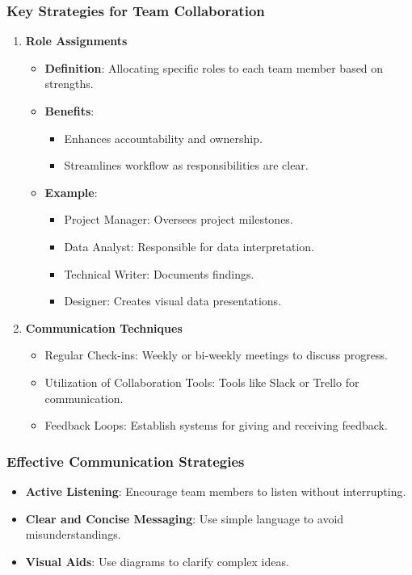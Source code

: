 \documentclass[aspectratio=169]{beamer}
\begin{document}
\begin{frame}[fragile]
    \frametitle{Key Strategies for Team Collaboration}
    \begin{enumerate}
        \item \textbf{Role Assignments}
        \begin{itemize}
            \item \textbf{Definition}: Allocating specific roles to each team member based on strengths.
            \item \textbf{Benefits}:
            \begin{itemize}
                \item Enhances accountability and ownership.
                \item Streamlines workflow as responsibilities are clear.
            \end{itemize}
            \item \textbf{Example}:
            \begin{itemize}
                \item Project Manager: Oversees project milestones.
                \item Data Analyst: Responsible for data interpretation.
                \item Technical Writer: Documents findings.
                \item Designer: Creates visual data presentations.
            \end{itemize}
        \end{itemize}

        \item \textbf{Communication Techniques}
        \begin{itemize}
            \item Regular Check-ins: Weekly or bi-weekly meetings to discuss progress.
            \item Utilization of Collaboration Tools: Tools like Slack or Trello for communication.
            \item Feedback Loops: Establish systems for giving and receiving feedback.
        \end{itemize}
    \end{enumerate}
\end{frame}

\begin{frame}[fragile]
    \frametitle{Effective Communication Strategies}
    \begin{itemize}
        \item \textbf{Active Listening}: Encourage team members to listen without interrupting.
        \item \textbf{Clear and Concise Messaging}: Use simple language to avoid misunderstandings.
        \item \textbf{Visual Aids}: Use diagrams to clarify complex ideas.
    \end{itemize}
\end{frame}
\end{document}
